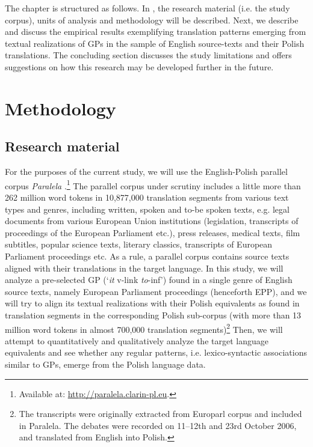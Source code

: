 \documentclass[output=paper]{langscibook}
\begin{document}
The chapter is structured as follows. In , the research material (i.e. the study corpus), units of analysis and methodology will be described. Next, we describe and discuss the empirical results exemplifying translation patterns emerging from textual realizations of GPs in the sample of English source-texts and their Polish translations. The concluding section discusses the study limitations and offers suggestions on how this research may be developed further in the future.

\section{Methodology}
\subsection{Research material}

For the purposes of the current study, we will use the English-Polish parallel corpus \textit{Paralela} \citep{Pęzik2016}.\footnote{Available at: \url{http://paralela.clarin-pl.eu}.} The parallel corpus under scrutiny includes a little more than 262 million word tokens in 10,877,000 translation segments from various text types and genres, including written, spoken and to-be spoken texts, e.g. legal documents from various European Union institutions (legislation, transcripts of proceedings of the European Parliament etc.), press releases, medical texts, film subtitles, popular science texts, literary classics, transcripts of European Parliament proceedings etc. As a rule, a parallel corpus contains source texts aligned with their translations in the target language. In this study, we will analyze a pre-selected GP (‘\textit{it} v-link {\ADJ} \textit{to}{}-inf’) found in a single genre of English source texts, namely European Parliament proceedings (henceforth EPP), and we will try to align its textual realizations with their Polish equivalents as found in translation segments in the corresponding Polish sub-corpus (with more than 13 million word tokens in almost 700,000 translation segments)\footnote{The transcripts were originally extracted from Europarl corpus \citep{Koehn2005} and included in Paralela. The debates were recorded on 11--12th and 23rd October 2006, and translated from English into Polish.} Then, we will attempt to quantitatively and qualitatively analyze the target language equivalents and see whether any regular patterns, i.e. lexico-syntactic associations similar to GPs, emerge from the Polish language data.
\end{document}
